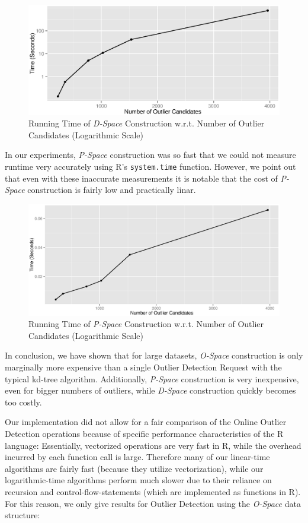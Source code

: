 \documentclass[runningheads]{llncs}
\begin{document}
\begin{figure}[H]
\includegraphics[width=\textwidth]{images/num_ocs_vs_dspace.eps}
\caption{Running Time of \emph{D-Space} Construction w.r.t. Number of Outlier Candidates (Logarithmic Scale)}
\end{figure}

In our experiments, \emph{P-Space} construction was so fast that we could not measure runtime very accurately using R's \texttt{system.time} function. However, we point out that even with these inaccurate measurements it is notable that the cost of \emph{P-Space} construction is fairly low and practically linar.

\begin{figure}[H]
\includegraphics[width=\textwidth]{images/pspace_vs_ocs.eps}
\caption{Running Time of \emph{P-Space} Construction w.r.t. Number of Outlier Candidates (Logarithmic Scale)}
\end{figure}

In conclusion, we have shown that for large datasets, \emph{O-Space} construction is only marginally more expensive than a single Outlier Detection Request with the typical kd-tree algorithm. Additionally, \emph{P-Space} construction is very inexpensive, even for bigger numbers of outliers, while \emph{D-Space} construction quickly becomes too costly. 

Our implementation did not allow for a fair comparison of the Online Outlier Detection operations because of specific performance characteristics of the R language: Essentially, vectorized operations are very fast in R, while the overhead incurred by each function call is large. Therefore many of our linear-time algorithms are fairly fast (because they utilize vectorization), while our logarithmic-time algorithms perform much slower due to their reliance on recursion and control-flow-statements (which are implemented as functions in R). For this reason, we only give results for Outlier Detection using the \emph{O-Space} data structure:
\end{document}
